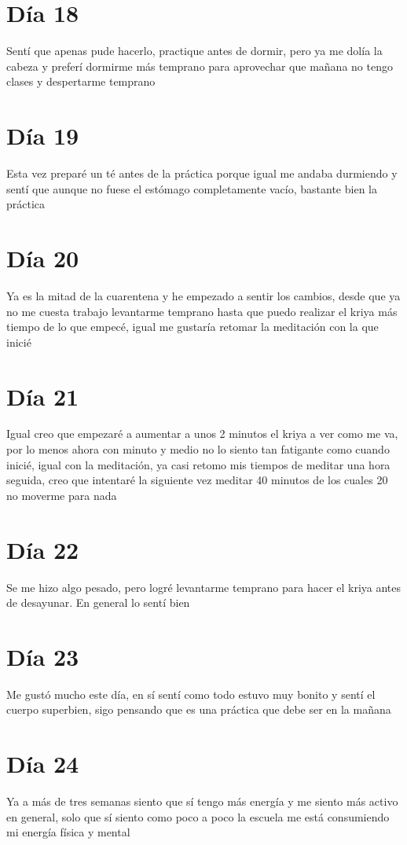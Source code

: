 \documentclass[11pt]{report}
\theoremstyle{plain}
\theoremstyle{definition}
\begin{document}
\section*{Día 18}
	Sentí que apenas pude hacerlo, practique antes de dormir, pero ya me dolía la cabeza y preferí dormirme más temprano para aprovechar que mañana no tengo clases y despertarme temprano
\section*{Día 19}%
	Esta vez preparé un té antes de la práctica porque igual me andaba durmiendo y sentí que aunque no fuese el estómago completamente vacío, bastante bien la práctica 
\section*{Día 20}%
	Ya es la mitad de la cuarentena y he empezado a sentir los cambios, desde que ya no me cuesta trabajo levantarme temprano hasta que puedo realizar el kriya más tiempo de lo que empecé, igual me gustaría retomar la meditación con la que inicié
\section*{Día 21}
	Igual creo que empezaré a aumentar a unos 2 minutos el kriya a ver como me va, por lo menos ahora con minuto y medio no lo siento tan fatigante como cuando inicié, igual con la meditación, ya casi retomo mis tiempos de meditar una hora seguida, creo que intentaré la siguiente vez meditar 40 minutos de los cuales 20 no moverme para nada
\section*{Día 22}
	Se me hizo algo pesado, pero logré levantarme temprano para hacer el kriya antes de desayunar. En general lo sentí bien
\section*{Día 23}
	Me gustó mucho este día, en sí sentí como todo estuvo muy bonito y sentí el cuerpo superbien, sigo pensando que es una práctica que debe ser en la mañana
\section*{Día 24}
	Ya a más de tres semanas siento que sí tengo más energía y me siento más activo en general, solo que sí siento como poco a poco la escuela me está consumiendo mi energía física y mental
\end{document}
